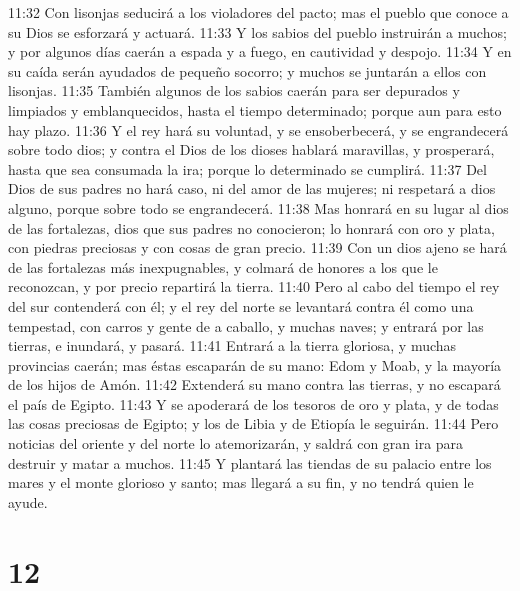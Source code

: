 11:32 Con lisonjas seducirá a los violadores del pacto; mas el pueblo que conoce a su Dios se esforzará y actuará.  
11:33 Y los sabios del pueblo instruirán a muchos; y por algunos días caerán a espada y a fuego, en cautividad y despojo.  
11:34 Y en su caída serán ayudados de pequeño socorro; y muchos se juntarán a ellos con lisonjas.  
11:35 También algunos de los sabios caerán para ser depurados y limpiados y emblanquecidos, hasta el tiempo determinado; porque aun para esto hay plazo.  
11:36 Y el rey hará su voluntad, y se ensoberbecerá, y se engrandecerá sobre todo dios;  y contra el Dios de los dioses hablará maravillas,  y prosperará, hasta que sea consumada la ira; porque lo determinado se cumplirá.  
11:37 Del Dios de sus padres no hará caso, ni del amor de las mujeres; ni respetará a dios alguno, porque sobre todo se engrandecerá.  
11:38 Mas honrará en su lugar al dios de las fortalezas, dios que sus padres no conocieron; lo honrará con oro y plata, con piedras preciosas y con cosas de gran precio.  
11:39 Con un dios ajeno se hará de las fortalezas más inexpugnables, y colmará de honores a los que le reconozcan, y por precio repartirá la tierra.  
11:40 Pero al cabo del tiempo el rey del sur contenderá con él; y el rey del norte se levantará contra él como una tempestad, con carros y gente de a caballo, y muchas naves; y entrará por las tierras, e inundará, y pasará.  
11:41 Entrará a la tierra gloriosa, y muchas provincias caerán; mas éstas escaparán de su mano: Edom y Moab, y la mayoría de los hijos de Amón.  
11:42 Extenderá su mano contra las tierras, y no escapará el país de Egipto.  
11:43 Y se apoderará de los tesoros de oro y plata, y de todas las cosas preciosas de Egipto; y los de Libia y de Etiopía le seguirán.  
11:44 Pero noticias del oriente y del norte lo atemorizarán, y saldrá con gran ira para destruir y matar a muchos. 
11:45 Y plantará las tiendas de su palacio entre los mares y el monte glorioso y santo; mas llegará a su fin, y no tendrá quien le ayude.  

\chapter{12}

